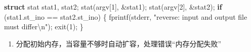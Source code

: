 \documentclass[
]{article}
\newenvironment{Shaded}{}{}
\newcommand{\ControlFlowTok}[1]{\textcolor[rgb]{0.00,0.44,0.13}{\textbf{#1}}}
\newcommand{\DecValTok}[1]{\textcolor[rgb]{0.25,0.63,0.44}{#1}}
\newcommand{\KeywordTok}[1]{\textcolor[rgb]{0.00,0.44,0.13}{\textbf{#1}}}
\newcommand{\NormalTok}[1]{#1}
\newcommand{\OperatorTok}[1]{\textcolor[rgb]{0.40,0.40,0.40}{#1}}
\newcommand{\SpecialCharTok}[1]{\textcolor[rgb]{0.25,0.44,0.63}{#1}}
\newcommand{\StringTok}[1]{\textcolor[rgb]{0.25,0.44,0.63}{#1}}
\begin{document}
\begin{Shaded}
	\begin{Highlighting}[]
		\KeywordTok{struct}\NormalTok{ stat stat1}\OperatorTok{,}\NormalTok{ stat2}\OperatorTok{;}
		\NormalTok{stat}\OperatorTok{(}\NormalTok{argv}\OperatorTok{[}\DecValTok{1}\OperatorTok{],} \OperatorTok{\&}\NormalTok{stat1}\OperatorTok{);}
		\NormalTok{stat}\OperatorTok{(}\NormalTok{argv}\OperatorTok{[}\DecValTok{2}\OperatorTok{],} \OperatorTok{\&}\NormalTok{stat2}\OperatorTok{);}
		\ControlFlowTok{if} \OperatorTok{(}\NormalTok{stat1}\OperatorTok{.}\NormalTok{st\_ino }\OperatorTok{==}\NormalTok{ stat2}\OperatorTok{.}\NormalTok{st\_ino}\OperatorTok{)} \OperatorTok{\{}
		\NormalTok{    fprintf}\OperatorTok{(}\NormalTok{stderr}\OperatorTok{,} \StringTok{"reverse: input and output file must differ}\SpecialCharTok{\textbackslash{}n}\StringTok{"}\OperatorTok{);}
		\NormalTok{    exit}\OperatorTok{(}\DecValTok{1}\OperatorTok{);}
		\OperatorTok{\}}
	\end{Highlighting}
\end{Shaded}

\begin{enumerate}[resume]
	\def\labelenumi{\arabic{enumi}.}
	\item
	      分配初始内存，当容量不够时自动扩容，处理错误``内存分配失败''
\end{enumerate}
\end{document}
